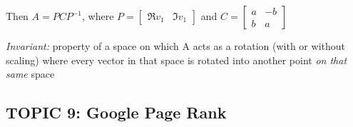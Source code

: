 \documentclass[12pt]{article} %
\begin{document}
Then
$A = PCP^{-1}$, where $P = \begin{bmatrix} 
	\Re v_1 & \Im v_1
\end{bmatrix}$ and $C = \begin{bmatrix}
	a & -b\\
	b & a
\end{bmatrix}$

\emph{Invariant:} property of a space on which A acts as a rotation (with or without scaling) where every vector in that space is rotated into another point \emph{on that same} space

\subsection{TOPIC 9: Google Page Rank}
\end{document}
